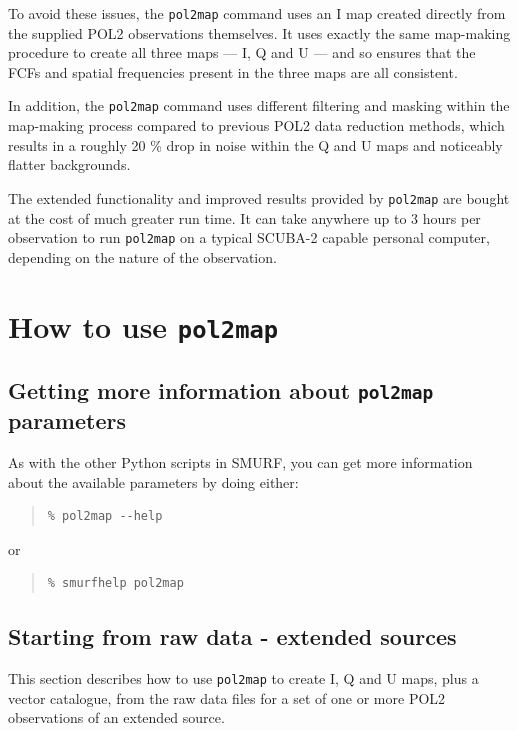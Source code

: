 \documentclass[twoside,11pt]{starlink}
\begin{document}
To avoid these issues, the \texttt{pol2map} command uses an I map created
directly from the supplied POL2 observations themselves. It uses exactly
the same map-making procedure to create all three maps --- I, Q and U --- and
so ensures that the FCFs and spatial frequencies present in the three maps are
all consistent.

In addition, the \texttt{pol2map} command uses different filtering and
masking within the map-making process compared to previous POL2 data reduction
methods, which results in a roughly 20 \% drop in noise within the Q and U
maps and noticeably flatter backgrounds.

The extended functionality and improved results provided by
\texttt{pol2map} are bought at the cost of much greater run time. It can
take anywhere up to 3 hours per observation to run \texttt{pol2map} on a
typical SCUBA-2 capable personal computer, depending on the nature of the
observation.

\section{How to use \texttt{pol2map}}

\subsection{Getting more information about \texttt{pol2map} parameters}
As with the other Python scripts in SMURF, you can get more information
about the available parameters by doing either:

\begin{quote}
\begin{verbatim}
% pol2map --help
\end{verbatim}
\end{quote}

or

\begin{quote}
\begin{verbatim}
% smurfhelp pol2map
\end{verbatim}
\end{quote}



\subsection{Starting from raw data - extended sources\label{se1}}
This section describes how to use \texttt{pol2map} to create I, Q and U
maps, plus a vector catalogue, from the raw data files for a set of one
or more POL2 observations of an extended source.
\end{document}
